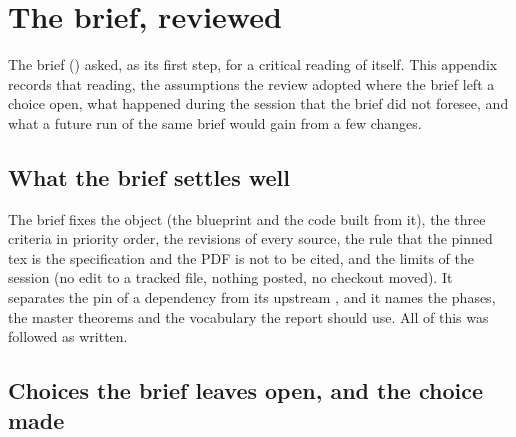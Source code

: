 \chapter{The brief, reviewed}\label{ch:brief}

The brief () asked, as its first step, for a
critical reading of itself. This appendix records that reading, the assumptions the review
adopted where the brief left a choice open, what happened during the session that the brief
did not foresee, and what a future run of the same brief would gain from a few changes.

\section{What the brief settles well}

The brief fixes the object (the blueprint and the code built from it), the three criteria in
priority order, the revisions of every source, the rule that the pinned tex is the
specification and the PDF is not to be cited, and the limits of the session (no edit to a
tracked file, nothing posted, no checkout moved). It separates the pin of a dependency from its
upstream , and it names the phases, the master theorems and the vocabulary the
report should use. All of this was followed as written.

\section{Choices the brief leaves open, and the choice made}

